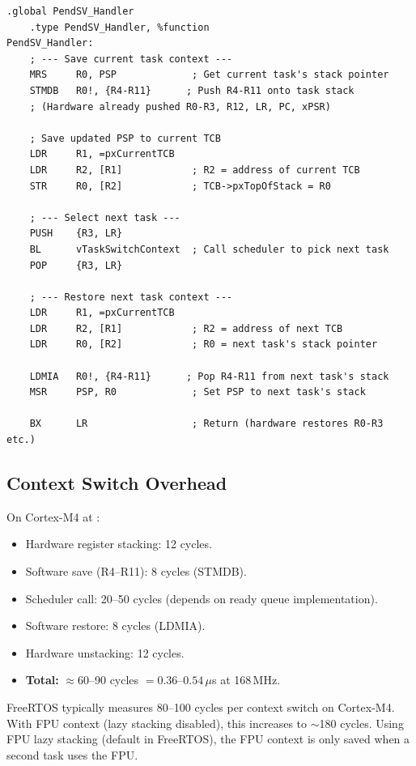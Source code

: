 \begin{lstlisting}[style=ARM, caption={Simplified PendSV handler for FreeRTOS-style context switch on Cortex-M4.}]
    .global PendSV_Handler
    .type PendSV_Handler, %function
PendSV_Handler:
    ; --- Save current task context ---
    MRS     R0, PSP             ; Get current task's stack pointer
    STMDB   R0!, {R4-R11}      ; Push R4-R11 onto task stack
    ; (Hardware already pushed R0-R3, R12, LR, PC, xPSR)

    ; Save updated PSP to current TCB
    LDR     R1, =pxCurrentTCB
    LDR     R2, [R1]            ; R2 = address of current TCB
    STR     R0, [R2]            ; TCB->pxTopOfStack = R0

    ; --- Select next task ---
    PUSH    {R3, LR}           
    BL      vTaskSwitchContext  ; Call scheduler to pick next task
    POP     {R3, LR}

    ; --- Restore next task context ---
    LDR     R1, =pxCurrentTCB
    LDR     R2, [R1]            ; R2 = address of next TCB
    LDR     R0, [R2]            ; R0 = next task's stack pointer

    LDMIA   R0!, {R4-R11}      ; Pop R4-R11 from next task's stack
    MSR     PSP, R0             ; Set PSP to next task's stack

    BX      LR                  ; Return (hardware restores R0-R3 etc.)
\end{lstlisting}

\subsection{Context Switch Overhead}

On Cortex-M4 at :
\begin{itemize}[nosep]
  \item Hardware register stacking: 12 cycles.
  \item Software save (R4--R11): 8 cycles (STMDB).
  \item Scheduler call: 20--50 cycles (depends on ready queue implementation).
  \item Software restore: 8 cycles (LDMIA).
  \item Hardware unstacking: 12 cycles.
  \item \textbf{Total:} $\approx 60$--90 cycles $= 0.36$--$0.54\,\mu$s at 168\,MHz.
\end{itemize}

\begin{practicalNote}
FreeRTOS typically measures 80--100 cycles per context switch on Cortex-M4. With FPU context (lazy stacking disabled), this increases to $\sim$180 cycles. Using FPU lazy stacking (default in FreeRTOS), the FPU context is only saved when a second task uses the FPU.
\end{practicalNote}

